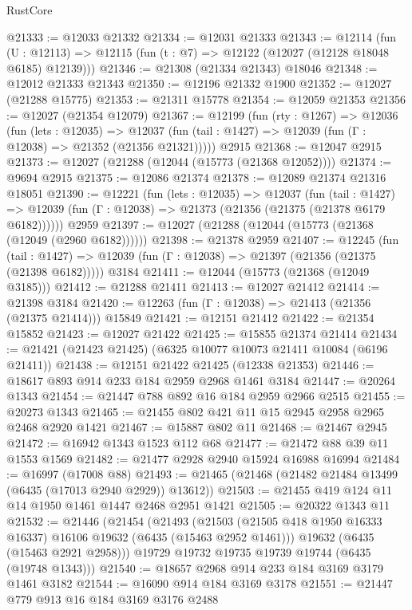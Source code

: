 \begin{lexlean}{RustCore}
\begin{coremodule}
@21333 := @12033 @21332
@21334 := @12031 @21333
@21343 := @12114
    (fun (U : @12113) => @12115 (fun (t : @7) => @12122 (@12027 (@12128 @18048 @6185) @12139)))
@21346 := @21308 (@21334 @21343) @18046
@21348 := @12012 @21333 @21343
@21350 := @12196 @21332 @1900
@21352 := @12027 (@21288 @15775)
@21353 := @21311 @15778
@21354 := @12059 @21353
@21356 := @12027 (@21354 @12079)
@21367 := @12199
    (fun (rty : @1267) =>
    @12036
      (fun (lets : @12035) =>
      @12037 (fun (tail : @1427) => @12039 (fun (Γ : @12038) => @21352 (@21356 @21321)))))
    @2915
@21368 := @12047 @2915
@21373 := @12027 (@21288 (@12044 (@15773 (@21368 @12052))))
@21374 := @9694 @2915
@21375 := @12086 @21374
@21378 := @12089 @21374 @21316 @18051
@21390 := @12221
    (fun (lets : @12035) =>
    @12037
      (fun (tail : @1427) =>
      @12039 (fun (Γ : @12038) => @21373 (@21356 (@21375 (@21378 @6179 @6182))))))
    @2959
@21397 := @12027 (@21288 (@12044 (@15773 (@21368 (@12049 (@2960 @6182))))))
@21398 := @21378 @2959
@21407 := @12245
    (fun (tail : @1427) => @12039 (fun (Γ : @12038) => @21397 (@21356 (@21375 (@21398 @6182)))))
    @3184
@21411 := @12044 (@15773 (@21368 (@12049 @3185)))
@21412 := @21288 @21411
@21413 := @12027 @21412
@21414 := @21398 @3184
@21420 := @12263 (fun (Γ : @12038) => @21413 (@21356 (@21375 @21414))) @15849
@21421 := @12151 @21412
@21422 := @21354 @15852
@21423 := @12027 @21422
@21425 := @15855 @21374 @21414
@21434 := @21421 (@21423 @21425) (@6325 @10077 @10073 @21411 @10084 (@6196 @21411))
@21438 := @12151 @21422 @21425 (@12338 @21353)
@21446 := @18617 @893 @914 @233 @184 @2959 @2968 @1461 @3184
@21447 := @20264 @1343
@21454 := @21447 @788 @892 @16 @184 @2959 @2966 @2515
@21455 := @20273 @1343
@21465 := @21455 @802 @421 @11 @15 @2945 @2958 @2965 @2468 @2920 @1421
@21467 := @15887 @802 @11
@21468 := @21467 @2945
@21472 := @16942 @1343 @1523 @112 @68
@21477 := @21472 @88 @39 @11 @1553 @1569
@21482 := @21477 @2928 @2940 @15924 @16988 @16994
@21484 := @16997 (@17008 @88)
@21493 := @21465 (@21468 (@21482 @21484 @13499 (@6435 (@17013 @2940 @2929)) @13612))
@21503 := @21455 @419 @124 @11 @14 @1950 @1461 @1447 @2468 @2951 @1421
@21505 := @20322 @1343 @11
@21532 := @21446
    (@21454
      (@21493
        (@21503 (@21505 @418 @1950 @16333 @16337) @16106 @19632 (@6435 (@15463 @2952 @1461)))
        @19632
        (@6435 (@15463 @2921 @2958)))
      @19729
      @19732
      @19735
      @19739
      @19744
      (@6435 (@19748 @1343)))
@21540 := @18657 @2968 @914 @233 @184 @3169 @3179 @1461 @3182
@21544 := @16090 @914 @184 @3169 @3178
@21551 := @21447 @779 @913 @16 @184 @3169 @3176 @2488

\end{coremodule}
\end{lexlean}
